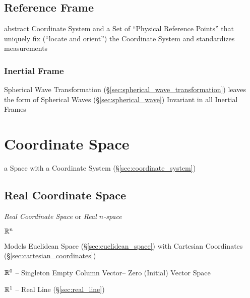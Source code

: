 \subsection{Reference Frame}\label{sec:reference_frame}

abstract Coordinate System and a Set of ``Physical Reference Points'' that
uniquely fix (``locate and orient'') the Coordinate System and standardizes
measurements



\subsubsection{Inertial Frame}\label{sec:intertial_frame}

Spherical Wave Transformation (\S\ref{sec:spherical_wave_transformation})
leaves the form of Spherical Waves (\S\ref{sec:spherical_wave}) Invariant in
all Inertial Frames



\section{Coordinate Space}\label{sec:coordinate_space}

a Space with a Coordinate System (\S\ref{sec:coordinate_system})



\subsection{Real Coordinate Space}\label{sec:real_coordinate_space}

\emph{Real Coordinate Space} or \emph{Real $n$-space}

$\mathbb{R}^n$

Models Euclidean Space (\S\ref{sec:euclidean_space}) with Cartesian
Coordinates (\S\ref{sec:cartesian_coordinates})

$\mathbb{R}^0$ -- Singleton Empty Column Vector-- Zero (Initial) Vector
Space

$\mathbb{R}^1$ -- Real Line (\S\ref{sec:real_line})


